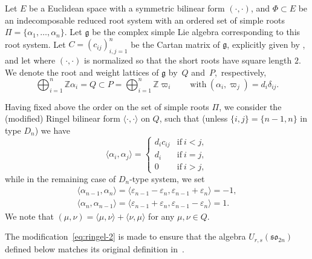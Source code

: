\documentclass[10pt,a4paper]{amsart}
\numberwithin{equation}{section}
\newcommand{\fg}{\mathfrak{g}}
\newcommand{\BZ}{\mathbb{Z}}
\newcommand{\sso}{\mathfrak{so}}
\begin{document}
Let $E$ be a Euclidean space with a symmetric bilinear form $(\cdot ,\cdot)$, and $\Phi \subset E$ be an indecomposable reduced root system with an ordered set of simple roots $\Pi = \{\alpha_{1},\dots ,\alpha_{n}\}$. Let $\mathfrak{g}$ be the complex simple Lie algebra corresponding to this root system.
Let $C = (c_{ij})_{i,j = 1}^{n}$ be the Cartan matrix of $\fg$, explicitly given by , and let  where $(\cdot,\cdot)$ is normalized so that the short roots have square length $2$.
We denote the root and weight lattices of $\fg$ by~$Q$ and~$P$,~respectively,
\begin{displaymath}
 \bigoplus_{i=1}^n \BZ \alpha_i=Q\subset P=\bigoplus_{i=1}^n \BZ \varpi_i
 \qquad \mathrm{with}\ (\alpha_i,\varpi_j)=d_i\delta_{ij}.
\end{displaymath}

Having fixed above the order on the set of simple roots $\Pi$, we consider the (modified) Ringel bilinear form $\langle \cdot ,\cdot \rangle$ on $Q$, such that (unless $\{i,j\}=\{n-1,n\}$ in type $D_n$) we have
\begin{equation}\label{eq:ringel-1}
 \langle \alpha_{i},\alpha_{j}\rangle =
 \begin{cases}
 d_{i}c_{ij} & \text{if}\ i < j, \\
 d_{i} & \text{if}\ i = j ,\\
 0 & \text{if}\ i > j,
 \end{cases}
\end{equation}
while in the remaining case of $D_n$-type system, we set
\begin{gather}
 \langle \alpha_{n-1},\alpha_{n} \rangle =
 \langle \varepsilon_{n-1}-\varepsilon_n,\varepsilon_{n-1}+\varepsilon_n\rangle = -1, \nonumber\\
 \langle \alpha_{n},\alpha_{n-1}\rangle =
 \langle \varepsilon_{n-1}+\varepsilon_n,\varepsilon_{n-1}-\varepsilon_n \rangle = 1.\label{eq:ringel-2}
\end{gather}
We note that $(\mu,\nu) = \langle \mu,\nu \rangle + \langle \nu,\mu \rangle$ for any $\mu,\nu \in Q$.

\begin{Remark}
The modification~\eqref{eq:ringel-2} is made to ensure that the algebra $U_{r,s}(\sso_{2n})$ defined below matches its original definition in~\cite{BGH1}.
\end{Remark}
\end{document}
